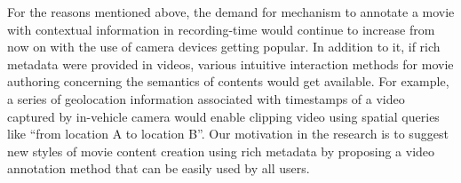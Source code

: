 For the reasons mentioned above, the demand for mechanism to annotate a movie with contextual information in recording-time would continue to increase from now on with the use of camera devices getting popular.
In addition to it, if rich metadata were provided in videos, various intuitive interaction methods for movie authoring concerning the semantics of contents would get available. 
For example, a series of geolocation information associated with timestamps of a video captured by in-vehicle camera would enable clipping video using spatial queries like ``from location A to location B''.
Our motivation in the research is to suggest new styles of movie content creation using rich metadata by proposing a video annotation method that can be easily used by all users.
